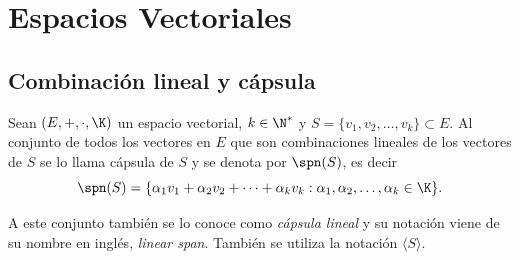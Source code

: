 \documentclass[compacto,10pt]{pubciencias-notas}
\begin{document}
\encabezado

\vspace*{-8mm}

\setcounter{section}{3}
\section{Espacios Vectoriales}
\setcounter{subsection}{3}
\subsection{Combinación lineal y cápsula}

\begin{defi}
Sean $(E,+,\cdot,\K)$ un espacio vectorial, $k\in\N^{*}$ y $S = \{v_1, v_2, \ldots, v_k\} \subset E$. Al conjunto de todos los vectores en $E$ que son combinaciones lineales de los vectores de $S$ se lo llama cápsula de $S$ y se denota por $\spn(S)$, es decir
    \[
        \spn(S) = \{\alpha_1 v_1 + \alpha_2 v_2 + \cdots + \alpha_k v_k:\alpha_1, \alpha_2, \ldots, \alpha_k \in \K\}.
    \]
\end{defi}

\begin{advertencia}
A este conjunto también se lo conoce como \emph{cápsula lineal} y su notación viene de su nombre en inglés, \emph{linear span}. También se utiliza la notación $\langle S\rangle$.
\end{advertencia}
\end{document}
